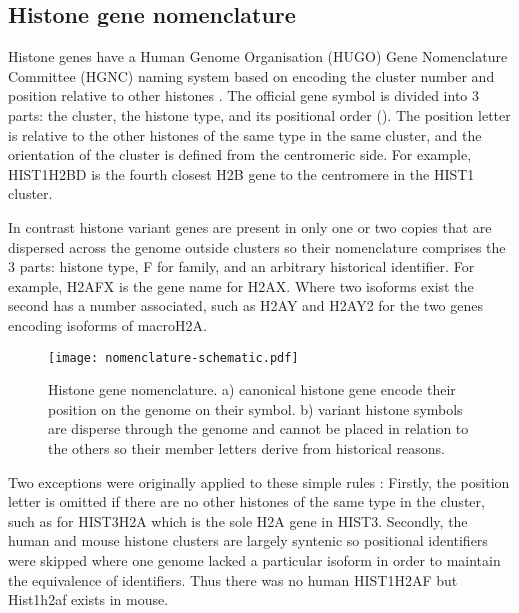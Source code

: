 
  \subsection{Histone gene nomenclature}
    Histone genes have a Human Genome Organisation (HUGO) Gene Nomenclature Committee (HGNC) naming system 
	based on encoding the cluster number and position relative to other histones \citep{Marzluff02}.
	The official gene symbol is divided into 3 parts: the cluster, the histone type, and its positional order ().
	The position letter is relative to the other histones of the same type in the same cluster, 
	and the orientation of the cluster is defined from the centromeric side. 
	For example, HIST1H2BD is the fourth closest H2B gene to the centromere in the HIST1 cluster.
	
	In contrast histone variant genes are present in only one or two copies 
	that are dispersed across the genome outside clusters 
	so their nomenclature comprises the 3 parts: histone type, F for family, and an arbitrary historical identifier.
	For example, H2AFX is the gene name for H2AX.
	Where two isoforms exist the second has a number associated, 
	such as H2AY and H2AY2 for the two genes encoding isoforms of macroH2A.
	
    \begin{figure*}
      \centering
      \texttt{[image: nomenclature-schematic.pdf]}
      \caption{Histone gene nomenclature. a) canonical histone gene encode their position
               on the genome on their symbol. b) variant histone symbols are disperse through
               the genome and cannot be placed in relation to the others so their member
               letters derive from historical reasons.}
      \label{fig:nomenclature}
    \end{figure*}

    Two exceptions were originally applied to these simple rules \citep{Marzluff02}: 
	Firstly, the position letter is omitted if there are no other histones of the same type in the cluster, 
	such as for HIST3H2A which is the sole H2A gene in HIST3. 
	Secondly, the human and mouse histone clusters are largely syntenic 
	so positional identifiers were skipped where one genome lacked a particular isoform 
	in order to maintain the equivalence of identifiers. 
	Thus there was no human HIST1H2AF but Hist1h2af exists in mouse.

